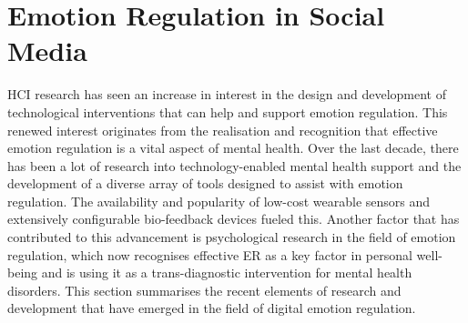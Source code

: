 \documentclass[lettersize,journal]{IEEEtran}
\begin{document}
\section{Emotion Regulation in Social Media}
HCI research has seen an increase in interest in the design and development of technological interventions that can help and support emotion regulation. This renewed interest originates from the realisation and recognition that effective emotion regulation is a vital aspect of mental health. Over the last decade, there has been a lot of research into technology-enabled mental health support and the development of a diverse array of tools designed to assist with emotion regulation. The availability and popularity of low-cost wearable sensors and extensively configurable bio-feedback devices fueled this. Another factor that has contributed to this advancement is psychological research in the field of emotion regulation, which now recognises effective ER as a key factor in personal well-being and is using it as a trans-diagnostic intervention for mental health disorders. This section summarises the recent elements of research and development that have emerged in the field of digital emotion regulation. 
\end{document}
